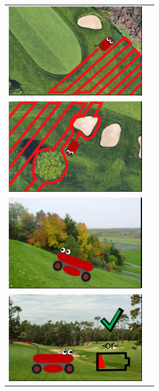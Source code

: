 \documentclass[12pt]{extarticle}
\begin{document}
\begin{table}[H]
  \def\arraystretch{5}

\begin{tabular}{cl}
\includegraphics[width=6cm]{usecase1_5.png} \\
\includegraphics[width=6cm]{usecase1_6.png} \\
\includegraphics[width=6cm]{usecase1_7.png} \\
\includegraphics[width=6cm]{usecase2_1.png} \\

\end{tabular}
\end{table}
\end{document}

